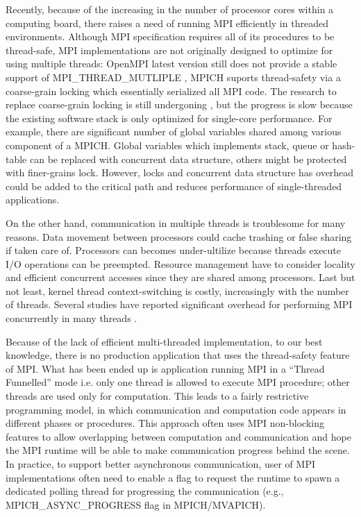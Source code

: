 \documentclass{sig-alternate-05-2015}
\begin{document}
Recently, because of the increasing in the number of processor cores within a
computing board, there raises a need of running MPI efficiently in threaded
environments. Although MPI specification requires all of its procedures to be
thread-safe, MPI implementations are not originally designed to optimize for
using multiple threads: OpenMPI latest version still does not
provide a stable support of MPI\_THREAD\_MUTLIPLE \cite{openmpifr},  MPICH suports thread-safety
via a coarse-grain locking which essentially serialized all MPI code. The
research to replace coarse-grain locking is still undergoning \cite{mpilock}, but the
progress is slow because the existing software stack is only optimized for
single-core performance. For example, there are significant number of global
variables shared among various component of a MPICH. Global variables which
implements stack, queue or hash-table can be replaced with concurrent data
structure, others might be protected with finer-grains lock.  However, locks
and concurrent data structure has overhead could be added to  the critical path
and reduces performance of single-threaded applications.

On the other hand, communication in multiple threads is troublesome for many
reasons. Data movement between processors could cache trashing or false sharing
if taken care of. Processors can becomes under-ultilize because threads execute
I/O operations can be preempted. Resource management have to consider locality
and efficient concurrent accesses since they are shared among processors. Last
but not least, kernel thread context-switching is costly, increasingly with the
number of threads. Several studies have reported significant overhead for
performing MPI concurrently in many threads \cite{threadissue, mpilock}.

Because of the lack of efficient multi-threaded implementation, to our best
knowledge, there is no production application that uses the thread-safety
feature of MPI. What has been ended up is application running MPI in a ``Thread
Funnelled'' mode i.e. only one thread is allowed to execute MPI procedure;
other threads are used only for computation. This leads to a fairly restrictive
programming model, in which communication and computation code appears in
different phases or procedures. This approach often uses MPI non-blocking
features to allow overlapping between computation and communication and hope
the MPI runtime will be able to make communication progress behind the scene.
In practice, to support better asynchronous communication, user of MPI
implementations often need to enable a flag to request the runtime to spawn a
dedicated polling thread for progressing the communication (e.g.,
MPICH_ASYNC_PROGRESS flag in MPICH/MVAPICH).
\end{document}
